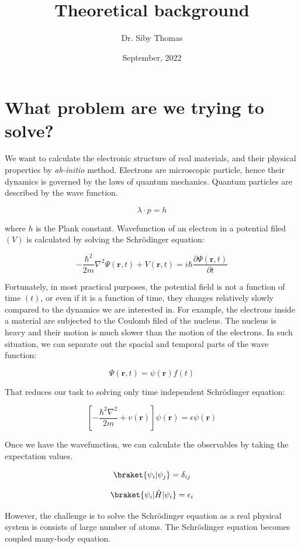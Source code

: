 \documentclass{article}
\title{Theoretical background}
\author{Dr. Siby Thomas}
\date{September, 2022}
\begin{document}
\maketitle

\section{What problem are we trying to solve?}

We want to calculate the electronic structure of real materials, and their
physical properties by {\it{ab-initio}} method. Electrons are microscopic particle,
hence their dynamics is governed by the laws of quantum mechanics. Quantum
particles are described by the wave function.

$$
\lambda \cdot p = h
$$

where $h$ is the Plank constant. Wavefunction of an electron in a potential
filed $(V)$ is calculated by solving the Schrödinger equation:

$$
-\frac{\hbar^2}{2m} \nabla^2 \Psi(\textbf{r}, t) + V(\textbf{r}, t) = i\hbar
\frac{\partial\Psi(\textbf{r}, t)}{\partial t}
$$

Fortunately, in most practical purposes, the potential field is not a function
of time $(t)$, or even if it is a function of time, they changes relatively
slowly compared to the dynamics we are interested in. For example, the electrons
inside a material are subjected to the Coulomb filed of the nucleus. The nucleus
is heavy and their motion is much slower than the motion of the electrons. In
such situation, we can separate out the spacial and temporal parts of the wave
function:

$$
\Psi(\textbf{r}, t) = \psi(\textbf{r}) f(t)
$$

That reduces our task to solving only time independent Schrödinger equation:

$$
\left[-\frac{\hbar^2 \nabla^2}{2m} + v(\textbf{r})\right] \psi(\textbf{r}) =
\epsilon \psi(\textbf{r})
$$

Once we have the wavefunction, we can calculate the observables by taking the
expectation values.

$$
\braket{\psi_i | \psi_j} = \delta_{ij}
$$

$$
\braket{\psi_i | \hat{H} | \psi_i} = \epsilon_i
$$

However, the challenge is to solve the Schrödinger equation as a real physical
system is consists of large number of atoms. The Schrödinger equation becomes
coupled many-body equation.
\end{document}
